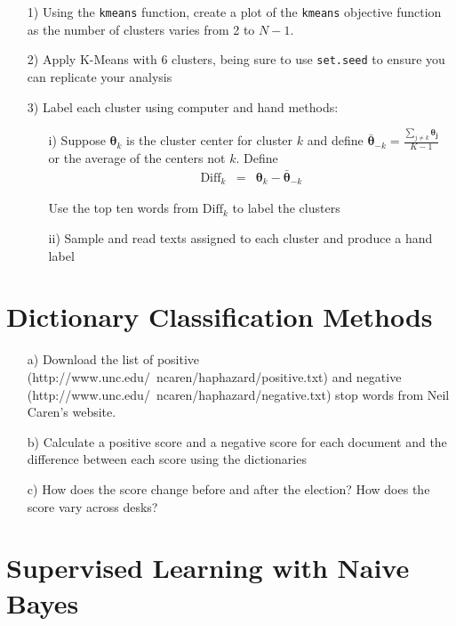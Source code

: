 \documentclass[12pt,letterpaper]{article}
\begin{document}
\begin{itemize}
\item[1)] Using the {\tt kmeans} function, create a plot of the {\tt kmeans} objective function as the number of clusters varies from 2 to $N - 1$.    
\item[2)] Apply K-Means with 6 clusters, being sure to use {\tt set.seed} to ensure you can replicate your analysis
\item[3)] Label each cluster using computer and hand methods:
\begin{itemize}
\item[i)] Suppose $\boldsymbol{\theta}_{k}$ is the cluster center for cluster $k$ and define $\bar{\boldsymbol{\theta}}_{-k} = \frac{\sum_{j \neq k} \boldsymbol{\theta_{j}}   }{K-1 }$ or the average of the centers not $k$.  Define 
\begin{eqnarray}
\text{Diff}_{k} & = & \boldsymbol{\theta}_{k} - \bar{\boldsymbol{\theta}}_{-k}\nonumber 
\end{eqnarray}

Use the top ten words from $\text{Diff}_{k}$ to label the clusters
\item[ii)] Sample and read texts assigned to each cluster and produce a hand label
\end{itemize}
\end{itemize}
\section{Dictionary Classification Methods}
\begin{itemize}
\item[a)] Download the list of positive (http://www.unc.edu/~ncaren/haphazard/positive.txt) and negative (http://www.unc.edu/~ncaren/haphazard/negative.txt) stop words from Neil Caren's website.
\item[b)] Calculate a positive score and a negative score for each document and the difference between each score using the dictionaries
\item[c)] How does the score change before and after the election?  How does the score vary across desks?
\end{itemize}


\section{Supervised Learning with Naive Bayes}
\end{document}
